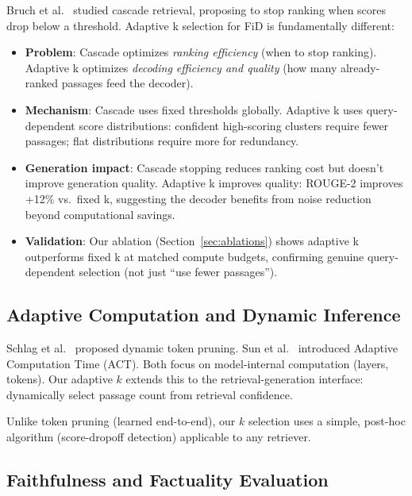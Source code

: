 \documentclass[11pt,a4paper]{article}
\begin{document}
Bruch et al.\ \cite{bruch2021efficient} studied cascade retrieval, proposing to stop ranking when scores drop below a threshold. Adaptive k selection for FiD is fundamentally different:

\begin{itemize}
\item \textbf{Problem}: Cascade optimizes \emph{ranking efficiency} (when to stop ranking). Adaptive k optimizes \emph{decoding efficiency and quality} (how many already-ranked passages feed the decoder).

\item \textbf{Mechanism}: Cascade uses fixed thresholds globally. Adaptive k uses query-dependent score distributions: confident high-scoring clusters require fewer passages; flat distributions require more for redundancy.

\item \textbf{Generation impact}: Cascade stopping reduces ranking cost but doesn't improve generation quality. Adaptive k improves quality: ROUGE-2 improves +12\% vs.\ fixed k, suggesting the decoder benefits from noise reduction beyond computational savings.

\item \textbf{Validation}: Our ablation (Section~\ref{sec:ablations}) shows adaptive k outperforms fixed k at matched compute budgets, confirming genuine query-dependent selection (not just ``use fewer passages'').
\end{itemize}

\subsection{Adaptive Computation and Dynamic Inference}

Schlag et al.\ \cite{schlag2023efficient} proposed dynamic token pruning. Sun et al.\ \cite{sun2023adaptive} introduced Adaptive Computation Time (ACT). Both focus on model-internal computation (layers, tokens). Our adaptive $k$ extends this to the retrieval-generation interface: dynamically select passage count from retrieval confidence.

Unlike token pruning (learned end-to-end), our $k$ selection uses a simple, post-hoc algorithm (score-dropoff detection) applicable to any retriever.

\subsection{Faithfulness and Factuality Evaluation}
\end{document}
